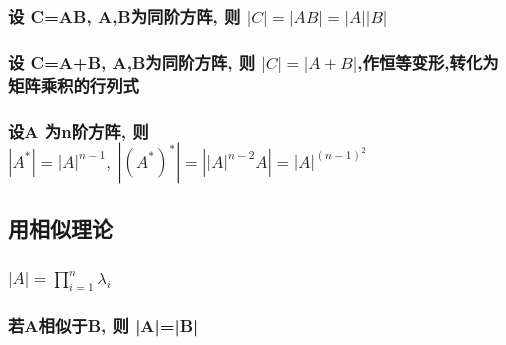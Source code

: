 \documentclass[UTF8]{ctexart}
\begin{document}
			\subsubsection{设 C=AB, A,B为同阶方阵, 则 $|C|=|AB|=|A||B|$}
			
			\subsubsection{设 C=A+B, A,B为同阶方阵, 则 $|C|=|A+B|$,作恒等变形,转化为矩阵乘积的行列式 }
			
			\subsubsection{设A 为n阶方阵, 则 $|A^*|=|A|^{n-1},\ |(A^*)^*|=\left| \left| A \right|^{n-2}A \right|=\left| A \right|^{\left( n-1 \right) ^2}	$}
		
		\subsection{用相似理论}
		
			\subsubsection{$\left| A \right|=\prod_{i=1}^n{\lambda _i}$}
			
			\subsubsection{若A相似于B, 则 |A|=|B|}
	
	
	
\end{document}
